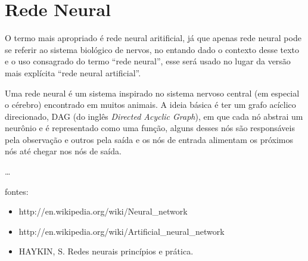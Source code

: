 \section{Rede Neural}

O termo mais apropriado é rede neural aritificial, já que apenas rede
neural pode se referir ao sistema biológico de nervos, no entando dado o
contexto desse texto e o uso consagrado do termo ``rede neural'', esse
será usado no lugar da versão mais explícita ``rede neural artificial''.

Uma rede neural é um sistema inspirado no sistema nervoso central (em
especial o cérebro) encontrado em muitos animais. A ideia básica é ter
um grafo acíclico direcionado, DAG (do inglês \emph{Directed Acyclic
Graph}), em que cada nó abstrai um neurônio e é representado como uma
função, alguns desses nós são responsáveis pela observação e outros pela
saída e os nós de entrada alimentam os próximos nós até chegar nos nós
de saída.

\ldots{}

fontes:

\begin{itemize}
\itemsep1pt\parskip0pt
\item
  http://en.wikipedia.org/wiki/Neural\_network
\item
  http://en.wikipedia.org/wiki/Artificial\_neural\_network
\item
  HAYKIN, S. Redes neurais princípios e prática.
\end{itemize}
